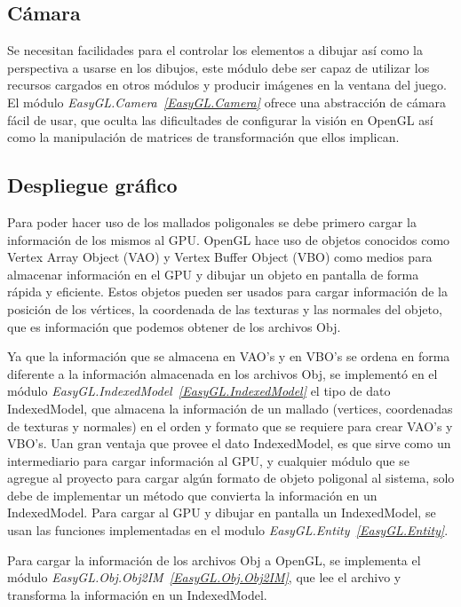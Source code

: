 \subsection{Cámara}

Se necesitan facilidades para el controlar los elementos a dibujar así como la perspectiva a usarse en los dibujos, este módulo debe ser capaz de utilizar los recursos cargados en otros módulos y producir imágenes en la ventana del juego. El módulo \emph{EasyGL.Camera~\ref{EasyGL.Camera}} ofrece una abstracción de cámara fácil de usar, que oculta las dificultades de configurar la visión en OpenGL así como la manipulación de matrices de transformación que ellos implican.

\subsection{Despliegue gráfico}

Para poder hacer uso de los mallados poligonales se debe primero cargar la información de los mismos al GPU. OpenGL hace uso de objetos conocidos como Vertex Array Object (VAO) y Vertex Buffer Object (VBO) como medios para almacenar información en el GPU y dibujar un objeto en pantalla de forma rápida y eficiente. Estos objetos pueden ser usados para cargar información de la posición de los vértices, la coordenada de las texturas y las normales del objeto, que es información que podemos obtener de los archivos Obj.

Ya que la información que se almacena en VAO's y en VBO's se ordena en forma diferente a la información almacenada en los archivos Obj, se implementó en el módulo \emph{EasyGL.IndexedModel~\ref{EasyGL.IndexedModel}} el tipo de dato IndexedModel, que almacena la información de un mallado (vertices, coordenadas de texturas y normales) en el orden y formato que se requiere para crear VAO's y VBO's. Uan gran ventaja que provee el dato IndexedModel, es que sirve como un intermediario para cargar información al GPU, y cualquier módulo que se agregue al proyecto para cargar algún formato de objeto poligonal al sistema, solo debe de implementar un método que convierta la información en un IndexedModel. Para cargar al GPU y dibujar en pantalla un IndexedModel, se usan las funciones implementadas en el modulo \emph{EasyGL.Entity~\ref{EasyGL.Entity}}.

Para cargar la información de los archivos Obj a OpenGL, se implementa el módulo \emph{EasyGL.Obj.Obj2IM~\ref{EasyGL.Obj.Obj2IM}}, que lee el archivo y transforma la información en un IndexedModel.

